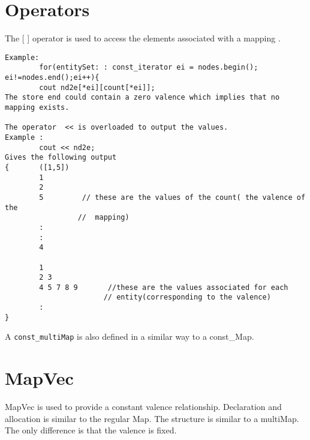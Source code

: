 \documentclass[letterpaper,12pt]{article}
\begin{document}
\section*{Operators}

The [ ] operator is used to access the elements associated with a
mapping .
\begin{verbatim}
Example:
        for(entitySet: : const_iterator ei = nodes.begin(); 
ei!=nodes.end();ei++){
        cout nd2e[*ei][count[*ei]];
The store end could contain a zero valence which implies that no mapping exists. 

The operator  << is overloaded to output the values.
Example :
        cout << nd2e;
Gives the following output
{       ([1,5])
        1
        2
        5         // these are the values of the count( the valence of the 
                 //  mapping)
        :       
        :
        4
        
        1 
        2 3 
        4 5 7 8 9       //these are the values associated for each 
                       // entity(corresponding to the valence)
        :
}
\end{verbatim}
A {\tt const\_multiMap} is also defined in a similar way to a const\_Map.


\section{MapVec}

MapVec is used to provide a constant valence relationship. Declaration and 
allocation is similar to the regular Map. The structure is similar to a 
multiMap. The only difference is that the valence is fixed.
\end{document}
